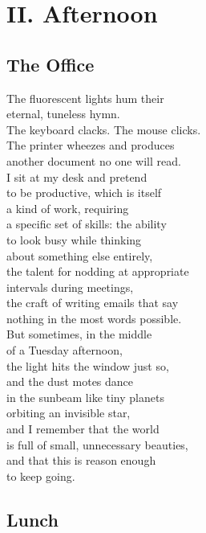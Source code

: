 \documentclass[
    language=english,
    doctype=poetry-collection,
    institution=none,
]{../../omnilatex}
\begin{document}
\chapter*{II. Afternoon}

\begin{center}
\begin{minipage}{0.7\textwidth}
\section*{The Office}

The fluorescent lights hum their\\
eternal, tuneless hymn.\\
The keyboard clacks. The mouse clicks.\\
The printer wheezes and produces\\
another document no one will read.\\

I sit at my desk and pretend\\
to be productive, which is itself\\
a kind of work, requiring\\
a specific set of skills: the ability\\
to look busy while thinking\\
about something else entirely,\\
the talent for nodding at appropriate\\
intervals during meetings,\\
the craft of writing emails that say\\
nothing in the most words possible.\\

But sometimes, in the middle\\
of a Tuesday afternoon,\\
the light hits the window just so,\\
and the dust motes dance\\
in the sunbeam like tiny planets\\
orbiting an invisible star,\\
and I remember that the world\\
is full of small, unnecessary beauties,\\
and that this is reason enough\\
to keep going.
\end{minipage}
\end{center}

\section*{Lunch}
\end{document}
